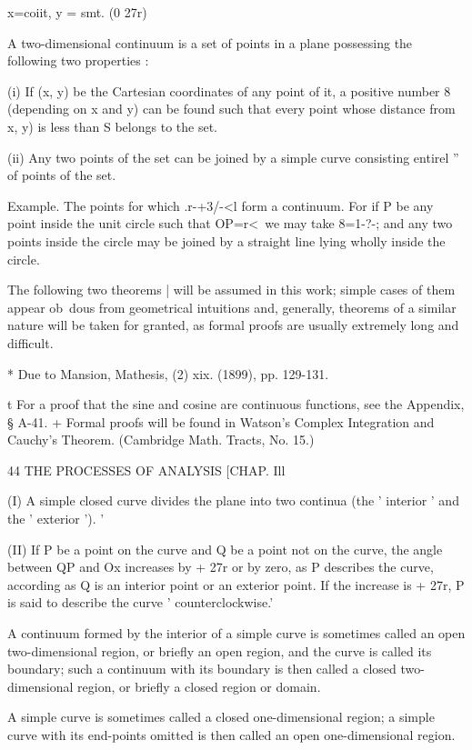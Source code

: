 x=coiit, y = smt. (0 27r)

A two-dimensional continuum is a set of points in a plane possessing
the following two properties :

(i) If (x, y) be the Cartesian coordinates of any point of it, a
positive number 8 (depending on x and y) can be found such that every
point whose distance from x, y) is less than S belongs to the set.

(ii) Any two points of the set can be joined by a simple curve
consisting entirel '' of points of the set.

Example. The points for which .r-+3/-<l form a continuum. For if P be
any point inside the unit circle such that OP=r<\, we may take 8=1-?-;
and any two points inside the circle may be joined by a straight line
lying wholly inside the circle.

The following two theorems | will be assumed in this work; simple
cases of them appear ob\ dous from geometrical intuitions and,
generally, theorems of a similar nature will be taken for granted, as
formal proofs are usually extremely long and difficult.

* Due to Mansion, Mathesis, (2) xix. (1899), pp. 129-131.

t For a proof that the sine and cosine are continuous functions, see
the Appendix, § A-41. + Formal proofs will be found in Watson's
Complex Integration and Cauchy's Theorem. (Cambridge Math. Tracts, No.
15.)



44 THE PROCESSES OF ANALYSIS [CHAP. Ill

(I) A simple closed curve divides the plane into two continua (the '
interior ' and the ' exterior '). '

(II) If P be a point on the curve and Q be a point not on the curve,
the angle between QP and Ox increases by + 27r or by zero, as P
describes the curve, according as Q is an interior point or an
exterior point. If the increase is + 27r, P is said to describe the
curve ' counterclockwise.'

A continuum formed by the interior of a simple curve is sometimes
called an open two-dimensional region, or briefly an open region, and
the curve is called its boundary; such a continuum with its boundary
is then called a closed two-dimensional region, or briefly a closed
region or domain.

A simple curve is sometimes called a closed one-dimensional region; a
simple curve with its end-points omitted is then called an open
one-dimensional region.

